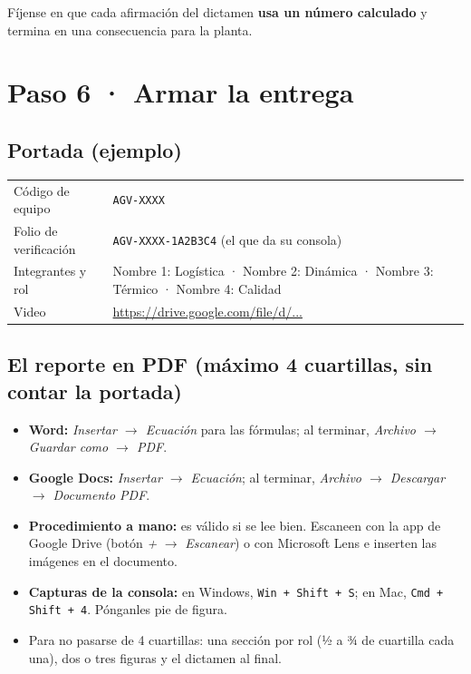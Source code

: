 \documentclass[11pt,letterpaper]{article}
\begin{document}
Fíjense en que cada afirmación del dictamen \textbf{usa un número calculado} y termina en una consecuencia para la planta.

\section{Paso 6 · Armar la entrega}
\subsection*{Portada (ejemplo)}
\begin{center}\small
\begin{tabularx}{0.9\linewidth}{@{}l Y@{}}\toprule
Código de equipo & \texttt{AGV-XXXX} \\
Folio de verificación & \texttt{AGV-XXXX-1A2B3C4} (el que da su consola) \\
Integrantes y rol & Nombre 1: Logística · Nombre 2: Dinámica · Nombre 3: Térmico · Nombre 4: Calidad \\
Video & \url{https://drive.google.com/file/d/...} \\ \bottomrule
\end{tabularx}\end{center}

\subsection*{El reporte en PDF (máximo 4 cuartillas, sin contar la portada)}
\begin{itemize}
\item \textbf{Word:} \emph{Insertar \(\rightarrow\) Ecuación} para las fórmulas; al terminar, \emph{Archivo \(\rightarrow\) Guardar como \(\rightarrow\) PDF}.
\item \textbf{Google Docs:} \emph{Insertar \(\rightarrow\) Ecuación}; al terminar, \emph{Archivo \(\rightarrow\) Descargar \(\rightarrow\) Documento PDF}.
\item \textbf{Procedimiento a mano:} es válido si se lee bien. Escaneen con la app de Google Drive (botón \emph{+} \(\rightarrow\) \emph{Escanear}) o con Microsoft Lens e inserten las imágenes en el documento.
\item \textbf{Capturas de la consola:} en Windows, \texttt{Win + Shift + S}; en Mac, \texttt{Cmd + Shift + 4}. Pónganles pie de figura.
\item Para no pasarse de 4 cuartillas: una sección por rol (½ a ¾ de cuartilla cada una), dos o tres figuras y el dictamen al final.
\end{itemize}
\end{document}
